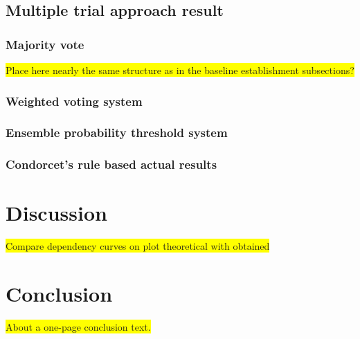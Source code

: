 \documentclass[12pt]{article}
\begin{document}
\subsection{Multiple trial approach result}

\subsubsection{Majority vote}
\colorbox{yellow}{Place here nearly the same structure as in the baseline establishment subsections?}

\subsubsection{Weighted voting system}
\subsubsection{Ensemble probability threshold system}
\subsubsection{Condorcet's rule based actual results}

\section{Discussion}
\colorbox{yellow}{Compare dependency curves on plot theoretical with obtained}

\newpage
\section{Conclusion}
\colorbox{yellow}{About a one-page conclusion text.}
\end{document}
